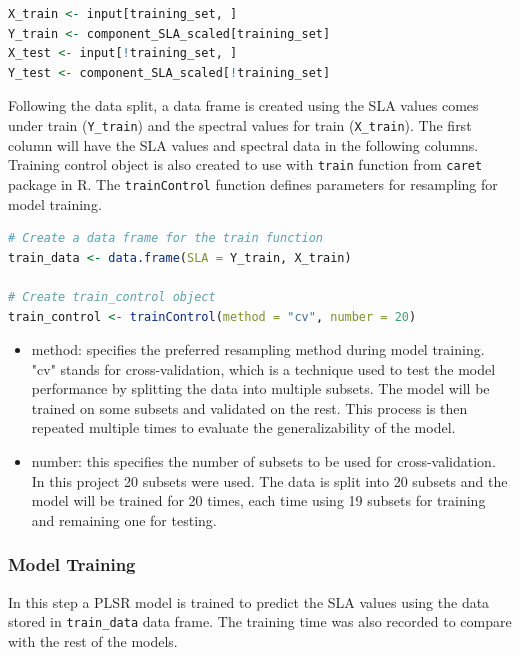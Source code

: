 \documentclass[12pt,a4paper]{report}
\begin{document}
\begin{lstlisting}[language=R, style=mystyle]
X_train <- input[training_set, ]
Y_train <- component_SLA_scaled[training_set]
X_test <- input[!training_set, ]
Y_test <- component_SLA_scaled[!training_set]
\end{lstlisting}

Following the data split, a data frame is created using the SLA values comes under train (\texttt{Y\_train}) and the spectral values for train (\texttt{X\_train}). The first column will have the SLA values and spectral data in the following columns. Training control object is also created to use with \texttt{train} function from \texttt{caret} package in R. The \texttt{trainControl} function defines parameters for resampling for model training. \\

\begin{lstlisting}[language=R, style=mystyle]
# Create a data frame for the train function
train_data <- data.frame(SLA = Y_train, X_train)

# Create train_control object
train_control <- trainControl(method = "cv", number = 20)
\end{lstlisting}

\begin{itemize}
    \item method: specifies the preferred resampling method during model training. "cv" stands for cross-validation, which is a technique used to test the model performance by splitting the data into multiple subsets. The model will be trained on some subsets and validated on the rest. This process is then repeated multiple times to evaluate the generalizability of the model.
    \item number: this specifies the number of subsets to be used for cross-validation. In this project 20 subsets were used. The data is split into 20 subsets and the model will be trained for 20 times, each time using 19 subsets for training and remaining one for testing. 
\end{itemize}

\subsubsection*{Model Training}
In this step a PLSR model is trained to predict the SLA values using the data stored in \texttt{train\_data} data frame. The training time was also recorded to compare with the rest of the models. \\
\end{document}
